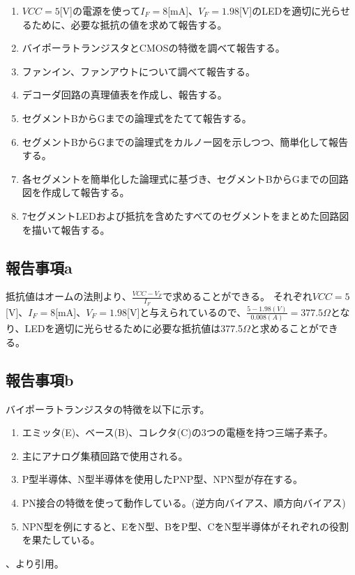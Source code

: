 \documentclass[a4paper,11pt,dvipdfmx]{jsarticle}
\begin{document}
\begin{enumerate}
  \label{tab:ReportContents}
  \item $VCC=5$[V]の電源を使って$I_F=8$[mA]、$V_F=1.98$[V]のLEDを適切に光らせるために、必要な抵抗の値を求めて報告する。
  \item バイポーラトランジスタとCMOSの特徴を調べて報告する。
  \item ファンイン、ファンアウトについて調べて報告する。
  \item デコーダ回路の真理値表を作成し、報告する。
  \item セグメントBからGまでの論理式をたてて報告する。
  \item セグメントBからGまでの論理式をカルノー図を示しつつ、簡単化して報告する。
  \item 各セグメントを簡単化した論理式に基づき、セグメントBからGまでの回路図を作成して報告する。
  \item 7セグメントLEDおよび抵抗を含めたすべてのセグメントをまとめた回路図を描いて報告する。
\end{enumerate}

\subsection{報告事項a}
抵抗値はオームの法則より、$\frac{VCC-V_F}{I_F}$で求めることができる。
それぞれ$VCC=5$[V]、$I_F=8$[mA]、$V_F=1.98$[V]と与えられているので、$\frac{5-1.98(V)}{0.008(A)}=377.5\Omega$となり、LEDを適切に光らせるために必要な抵抗値は377.5$\Omega$と求めることができる。

\subsection{報告事項b}
バイポーラトランジスタの特徴を以下に示す。

\begin{enumerate}
  \item エミッタ(E)、ベース(B)、コレクタ(C)の3つの電極を持つ三端子素子。
  \item 主にアナログ集積回路で使用される。
  \item P型半導体、N型半導体を使用したPNP型、NPN型が存在する。
  \item PN接合の特徴を使って動作している。(逆方向バイアス、順方向バイアス)
  \item NPN型を例にすると、EをN型、BをP型、CをN型半導体がそれぞれの役割を果たしている。
\end{enumerate}
\cite{Khoritsu}、\cite{Ohmsha}より引用。\\
\end{document}

